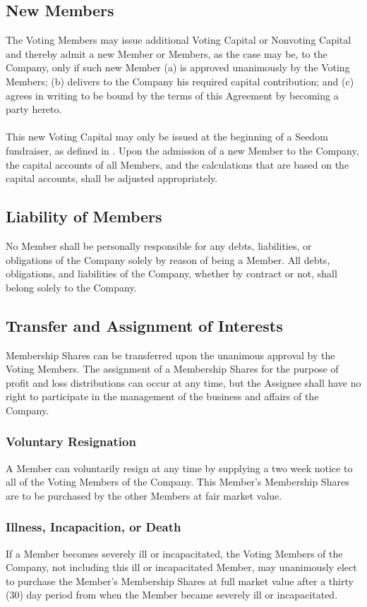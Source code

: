 \documentclass[11pt]{article}
\begin{document}
\subsection{New Members}
The Voting Members may issue additional Voting Capital or Nonvoting Capital and thereby admit a new Member or Members, as the case may be, to the Company, only if such new Member (a) is approved unanimously by the Voting Members; (b) delivers to the Company his required capital contribution; and (c) agrees in writing to be bound by the terms of this Agreement by becoming a party hereto.\\\\
This new Voting Capital may only be issued at the beginning of a Seedom fundraiser, as defined in . Upon the admission of a new Member to the Company, the capital accounts of all Members, and the calculations that are based on the capital accounts, shall be adjusted appropriately.

\subsection{Liability of Members}
No Member shall be personally responsible for any debts, liabilities, or obligations of the Company solely by reason of being a Member. All debts, obligations, and liabilities of the Company, whether by contract or not, shall belong solely to the Company.

\subsection{Transfer and Assignment of Interests}
Membership Shares can be transferred upon the unanimous approval by the Voting Members. The assignment of a Membership Shares for the purpose of profit and loss distributions can occur at any time, but the Assignee shall have no right to participate in the management of the business and affairs of the Company.

\subsubsection{Voluntary Resignation}
A Member can voluntarily resign at any time by supplying a two week notice to all of the Voting Members of the Company. This Member’s Membership Shares are to be purchased by the other Members at fair market value.

\subsubsection{Illness, Incapacition, or Death}
If a Member becomes severely ill or incapacitated, the Voting Members of the Company, not including this ill or incapacitated Member, may unanimously elect to purchase the Member's Membership Shares at full market value after a thirty (30) day period from when the Member became severely ill or incapacitated.
\end{document}
